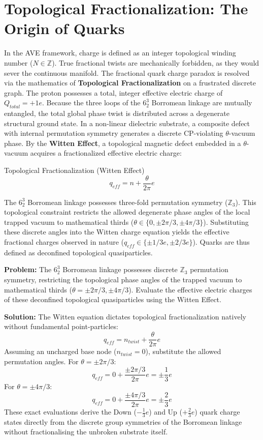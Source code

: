 \section{Topological Fractionalization: The Origin of Quarks}
In the AVE framework, charge is defined as an integer topological winding number ($N \in \mathbb{Z}$). True fractional twists are mechanically forbidden, as they would sever the continuous manifold. The fractional quark charge paradox is resolved via the mathematics of \textbf{Topological Fractionalization} on a frustrated discrete graph. The proton possesses a total, integer effective electric charge of $Q_{total} = +1e$. Because the three loops of the $6^3_2$ Borromean linkage are mutually entangled, the total global phase twist is distributed across a degenerate structural ground state. In a non-linear dielectric substrate, a composite defect with internal permutation symmetry generates a discrete CP-violating $\theta$-vacuum phase. By the \textbf{Witten Effect}, a topological magnetic defect embedded in a $\theta$-vacuum acquires a fractionalized effective electric charge:

\begin{resultbox}{Topological Fractionalization (Witten Effect)}
\begin{equation}
    q_{eff} = n + \frac{\theta}{2\pi}e
\end{equation}
\end{resultbox}

The $6_{2}^{3}$ Borromean linkage possesses three-fold permutation symmetry ($\mathbb{Z}_{3}$). This topological constraint restricts the allowed degenerate phase angles of the local trapped vacuum to mathematical thirds ($\theta\in\{0,\pm2\pi/3,\pm4\pi/3\}$). Substituting these discrete angles into the Witten charge equation yields the effective fractional charges observed in nature ($q_{eff}\in\{\pm1/3e,\pm2/3e\}$). Quarks are thus defined as deconfined topological quasiparticles.

\begin{examplebox}
\textbf{Problem:} The $6^3_2$ Borromean linkage possesses discrete $\mathbb{Z}_3$ permutation symmetry, restricting the topological phase angles of the trapped vacuum to mathematical thirds ($\theta = \pm 2\pi/3, \pm 4\pi/3$). Evaluate the effective electric charges of these deconfined topological quasiparticles using the Witten Effect.

\textbf{Solution:} The Witten equation dictates topological fractionalization natively without fundamental point-particles:
\[ q_{eff} = n_{twist} + \frac{\theta}{2\pi} e \]
Assuming an uncharged base node ($n_{twist} = 0$), substitute the allowed permutation angles.
For $\theta = \pm 2\pi/3$:
\[ q_{eff} = 0 + \frac{\pm 2\pi/3}{2\pi} e = \pm \frac{1}{3} e \]
For $\theta = \pm 4\pi/3$:
\[ q_{eff} = 0 + \frac{\pm 4\pi/3}{2\pi} e = \pm \frac{2}{3} e \]
These exact evaluations derive the Down ($-\frac{1}{3}e$) and Up ($+\frac{2}{3}e$) quark charge states directly from the discrete group symmetries of the Borromean linkage without fractionalising the unbroken substrate itself.
\end{examplebox}

